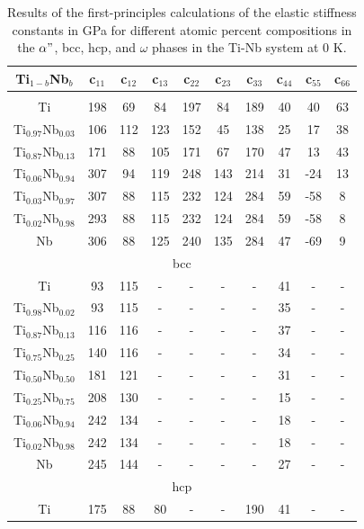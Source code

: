 \newpage
\begin{longtable}[H]{ c c c c c c c c c c }
	\caption{Results of the first-principles calculations of the elastic stiffness constants in GPa for different atomic percent compositions in the $\alpha"$, bcc, hcp, and $\omega$  phases in the Ti-Nb system at 0 K.} 	\label{Ch7-table:tinbdata} \\
	\hline
	Ti$_{1-b}$Nb$_b$ & c$_{11}$ & c$_{12}$ & c$_{13}$ & c$_{22}$ & c$_{23}$ & c$_{33}$ & c$_{44}$ & c$_{55}$ & c$_{66}$\\
	\hline
	\endhead
	\hline
	\endfoot
	\multicolumn{10}{c}{$\alpha"$}\\
	\hline
	Ti & 198 & 69 & 84 & 197 & 84 & 189 & 40 & 40 & 63 \\		
	Ti$_{0.97}$Nb$_{0.03}$ & 106 & 112 & 123 & 152 & 45 & 138 & 25 & 17 & 38 \\
	Ti$_{0.87}$Nb$_{0.13}$ & 171 & 88 & 105 & 171 & 67 & 170 & 47 & 13 & 43 \\
	Ti$_{0.06}$Nb$_{0.94}$ & 307 & 94 & 119 & 248 & 143 & 214 & 31 & -24 & 13 \\
	Ti$_{0.03}$Nb$_{0.97}$ & 307 & 88 & 115 & 232 & 124 & 284 & 59 & -58 & 8 \\
	Ti$_{0.02}$Nb$_{0.98}$ & 293 & 88 & 115 & 232 & 124 & 284 & 59 & -58 & 8 \\
	Nb & 306 & 88 & 125 & 240 & 135 & 284 & 47 & -69 & 9 \\
	\hline
	\multicolumn{10}{c}{bcc}\\
	\hline
	Ti & 93 & 115 & - & - & - & - & 41 & - & - \\		
	Ti$_{0.98}$Nb$_{0.02}$ & 93 & 115 & - & - & - & - & 35 & - & - \\
	Ti$_{0.87}$Nb$_{0.13}$ & 116 & 116 & - & - & - & - & 37 & - & - \\
	Ti$_{0.75}$Nb$_{0.25}$ & 140 & 116 & - & - & - & - & 34 & - & - \\
	Ti$_{0.50}$Nb$_{0.50}$ & 181 & 121 & - & - & - & - & 31 & - & - \\
	Ti$_{0.25}$Nb$_{0.75}$ & 208 & 130 & - & - & - & - & 15 & - & - \\
	Ti$_{0.06}$Nb$_{0.94}$ & 242 & 134 & - & - & - & - & 18 & - & - \\
	Ti$_{0.02}$Nb$_{0.98}$ & 242 & 134 & - & - & - & - & 18 & - & - \\
	Nb & 245 & 144 & - & - & - & - & 27 & - & - \\
	\hline
	\multicolumn{10}{c}{hcp}\\
	\hline
	Ti & 175 & 88 & 80 & - & - & 190 & 41 & - & - \\		

\end{longtable}
